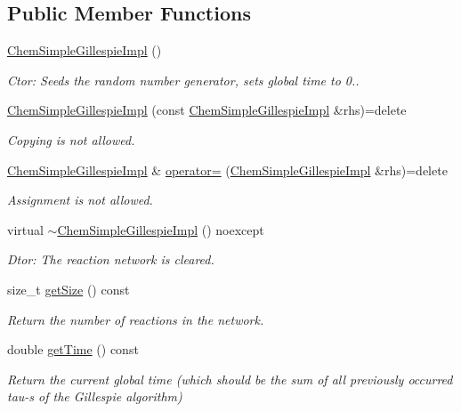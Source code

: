 \subsection*{Public Member Functions}
\begin{DoxyCompactItemize}
\item 
\hyperlink{classChemSimpleGillespieImpl_a8a5a22813fccd094cb8d040fb444a38d}{Chem\+Simple\+Gillespie\+Impl} ()
\begin{DoxyCompactList}\small\item\em Ctor\+: Seeds the random number generator, sets global time to 0.. \end{DoxyCompactList}\item 
\hyperlink{classChemSimpleGillespieImpl_a57df6c42b5fa041c2a4b9524def57293}{Chem\+Simple\+Gillespie\+Impl} (const \hyperlink{classChemSimpleGillespieImpl}{Chem\+Simple\+Gillespie\+Impl} \&rhs)=delete
\begin{DoxyCompactList}\small\item\em Copying is not allowed. \end{DoxyCompactList}\item 
\hyperlink{classChemSimpleGillespieImpl}{Chem\+Simple\+Gillespie\+Impl} \& \hyperlink{classChemSimpleGillespieImpl_a13493eb1d5c659ba5804662ae4a0c42c}{operator=} (\hyperlink{classChemSimpleGillespieImpl}{Chem\+Simple\+Gillespie\+Impl} \&rhs)=delete
\begin{DoxyCompactList}\small\item\em Assignment is not allowed. \end{DoxyCompactList}\item 
virtual \hyperlink{classChemSimpleGillespieImpl_a1648d1fd20701b1facd46a988e6cd6c7}{$\sim$\+Chem\+Simple\+Gillespie\+Impl} () noexcept
\begin{DoxyCompactList}\small\item\em Dtor\+: The reaction network is cleared. \end{DoxyCompactList}\item 
size\+\_\+t \hyperlink{classChemSimpleGillespieImpl_a2792a46a1679ba52440db752e88ec67d}{get\+Size} () const 
\begin{DoxyCompactList}\small\item\em Return the number of reactions in the network. \end{DoxyCompactList}\item 
double \hyperlink{classChemSimpleGillespieImpl_a4bdf3dcae1a5e482c58e03f82291400b}{get\+Time} () const 
\begin{DoxyCompactList}\small\item\em Return the current global time (which should be the sum of all previously occurred tau-\/s of the Gillespie algorithm) \end{DoxyCompactList}\item 

\end{DoxyCompactItemize}

